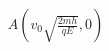 \documentclass[preview]{standalone}
\begin{document}
\begin{align*}
A\left(v_0\sqrt{\frac{2mh}{qE}}, 0\right)
\end{align*}
\end{document}
